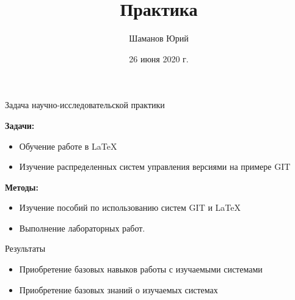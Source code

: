 \documentclass{beamer}
\begin{document}
	
	\title {Практика}  
	
	\author {Шаманов Юрий} 	
	
	
	\date{26 июня 2020 г.}
	
	\begin{frame}
		
		\titlepage
		
	\end{frame}
	
	
	
	\begin{frame}{Задача научно-исследовательской практики}
		
		\textbf{Задачи:}
		
		\begin{itemize}
			
			\item Обучение работе в LaTeX
			
			\item Изучение распределенных систем управления версиями на примере GIT
			
		\end{itemize}
		
		\textbf{Методы:}
		
		\begin{itemize}
			
			\item Изучение пособий по использованию систем GIT и LaTeX
			
			\item Выполнение лабораторных работ.
			
			
			
		\end{itemize}
		
	\end{frame}
	
	
	
	\begin{frame}{Результаты}
		
		\begin{itemize}
			
			\item Приобретение базовых навыков работы с изучаемыми системами
			
			\item Приобретение базовых знаний о изучаемых системах
			
		\end{itemize}
		
	\end{frame}	
	
\end{document}
